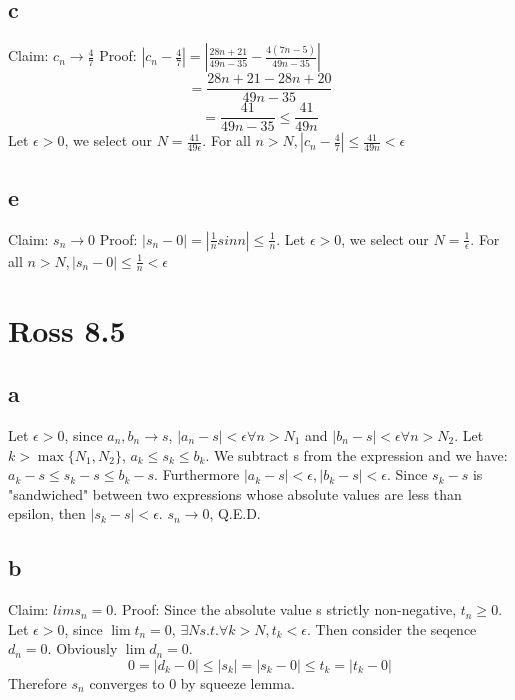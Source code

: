 \documentclass[12pt]{article}
\begin{document}
\subsection{c}
Claim: $c_n \to \frac{4}{7}$
\newline
Proof: $|c_n- \frac{4}{7}| = |\frac{28n+21}{49n-35} - \frac{4(7n-5)}{49n-35}|$
$$= \frac{28n+21-28n+20}{49n-35}$$
$$= \frac{41}{49n-35} \leq \frac{41}{49n}$$
\newline
Let  $\epsilon > 0$, we select our $N = \frac{41}{49\epsilon}$. For all $n>N, |c_n- \frac{4}{7}| \leq \frac{41}{49n} < \epsilon$

\subsection{e}
Claim: $s_n \to 0$
\newline
Proof: $|s_n - 0| = |\frac{1}{n}sin n| \leq \frac{1}{n}$.
\newline
Let  $\epsilon > 0$, we select our $N = \frac{1}{\epsilon}$. For all $n>N, |s_n-0| \leq \frac{1}{n} < \epsilon$
\newpage


\section{Ross 8.5}
\subsection{a}
Let $\epsilon > 0$, since $a_n, b_n \to s$, $|a_n-s|<\epsilon \forall n > N_1$ and $|b_n-s|<\epsilon \forall n > N_2$.
\newline
Let $k> \max \{ N_1, N_2\}$, $a_k \leq s_k \leq b_k$. We subtract s from the expression and we have: $a_k-s \leq s_k -s \leq b_k-s$. Furthermore $|a_k-s|<\epsilon, |b_k - s| < \epsilon$.
\newline
Since $s_k-s$ is "sandwiched" between two expressions whose absolute values are less than epsilon, then $|s_k-s|<\epsilon$.
\newline
$s_n \to 0$, Q.E.D.

\subsection{b}
Claim: $lim s_n = 0$.
\newline
Proof:
Since the absolute value s strictly non-negative, $t_n \geq 0$. Let $\epsilon>0$, since $\lim t_n = 0$, $\exists N s.t. \forall k> N, t_k < \epsilon$. Then consider the seqence $d_n = 0$. Obviously $\lim d_n = 0$.
\newline
$$0 = |d_k-0| \leq |s_k| = |s_k - 0| \leq t_k = |t_k - 0|$$
Therefore $s_n$ converges to 0 by squeeze lemma.
\newpage
\end{document}
